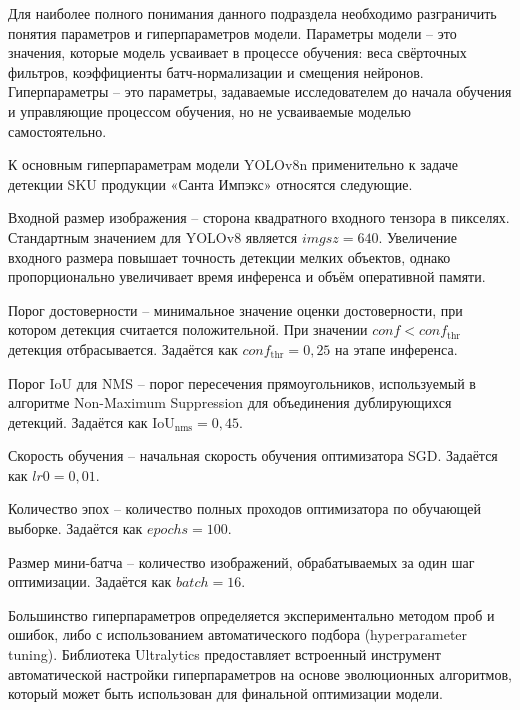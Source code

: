{\gostFont

  \par \redline Для наиболее полного понимания данного подраздела необходимо разграничить понятия параметров и гиперпараметров модели. Параметры модели {--} это значения, которые модель усваивает в процессе обучения: веса свёрточных фильтров, коэффициенты батч-нормализации и смещения нейронов. Гиперпараметры {--} это параметры, задаваемые исследователем до начала обучения и управляющие процессом обучения, но не усваиваемые моделью самостоятельно.

  \par \redline К основным гиперпараметрам модели YOLOv8n применительно к задаче детекции SKU продукции «Санта Импэкс» относятся следующие.

  \par \redline Входной размер изображения {--} сторона квадратного входного тензора в пикселях. Стандартным значением для YOLOv8 является $imgsz = 640$. Увеличение входного размера повышает точность детекции мелких объектов, однако пропорционально увеличивает время инференса и объём оперативной памяти.

  \par \redline Порог достоверности {--} минимальное значение оценки достоверности, при котором детекция считается положительной. При значении $conf < conf_{\mathrm{thr}}$ детекция отбрасывается. Задаётся как $conf_{\mathrm{thr}} = 0{,}25$ на этапе инференса.

  \par \redline Порог IoU для NMS {--} порог пересечения прямоугольников, используемый в алгоритме Non-Maximum Suppression для объединения дублирующихся детекций. Задаётся как $\mathrm{IoU}_{\mathrm{nms}} = 0{,}45$.

  \par \redline Скорость обучения {--} начальная скорость обучения оптимизатора SGD. Задаётся как $lr0 = 0{,}01$.

  \par \redline Количество эпох {--} количество полных проходов оптимизатора по обучающей выборке. Задаётся как $epochs = 100$.

  \par \redline Размер мини-батча {--} количество изображений, обрабатываемых за один шаг оптимизации. Задаётся как $batch = 16$.

  \par \redline Большинство гиперпараметров определяется экспериментально методом проб и ошибок, либо с использованием автоматического подбора (hyperparameter tuning). Библиотека Ultralytics предоставляет встроенный инструмент автоматической настройки гиперпараметров на основе эволюционных алгоритмов, который может быть использован для финальной оптимизации модели.

  \par 
}

